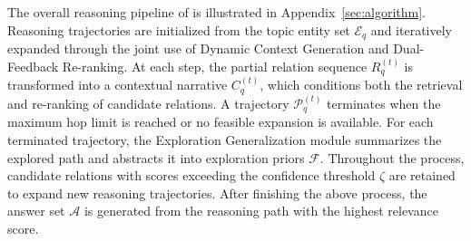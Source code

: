 The overall reasoning pipeline of \method{} is illustrated in Appendix~\ref{sec:algorithm}. Reasoning trajectories are initialized from the topic entity set $\mathcal{E}_q$ and iteratively expanded through the joint use of Dynamic Context Generation and Dual-Feedback Re-ranking. At each step, the partial relation sequence $R_q^{(t)}$ is transformed into a contextual narrative $C_q^{(t)}$, which conditions both the retrieval and re-ranking of candidate relations. A trajectory $\mathcal{P}_q^{(t)}$ terminates when the maximum hop limit is reached or no feasible expansion is available. For each terminated trajectory, the Exploration Generalization module summarizes the explored path and abstracts it into exploration priors $\mathcal{F}$. Throughout the process, candidate relations with scores exceeding the confidence threshold $\zeta$ are retained to expand new reasoning trajectories. After finishing the above process, the answer set $\mathcal{A}$ is generated from the reasoning path with the highest relevance score.






